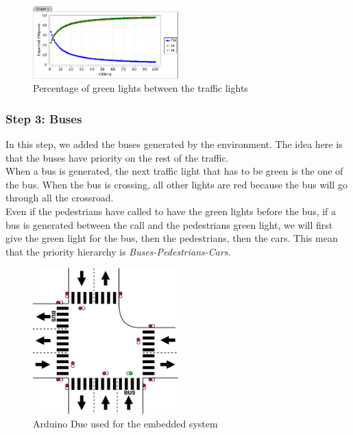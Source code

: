 \begin{figure}[H]\label{fig:prism1}
  \centering
    \includegraphics[width=0.5\textwidth]{picture/graphprism.png}
    \caption{Percentage of green lights between the traffic lights}
\end{figure}


\subsubsection{Step 3: Buses}
In this step, we added the buses generated by the environment. The idea here is that the buses have priority on the rest of the traffic. \\
When a bus is generated, the next traffic light that has to be green is the one of the bus. When the bus is crossing, all other lights are red because the bus will go through all the crossroad. \\
Even if the pedestrians have called to have the green lights before the bus, if a bus is generated between the call and the pedestrians green light, we will first give the green light for the bus, then the pedestrians, then the cars. This mean that the priority hierarchy is \textit{Buses-Pedestrians-Cars}. 


\begin{figure}[H]\label{fig:step3}
  \centering
    \includegraphics[width=0.5\textwidth]{picture/model/trafficlight_step3_s2.png}
    \caption{Arduino Due used for the embedded system}
\end{figure}


